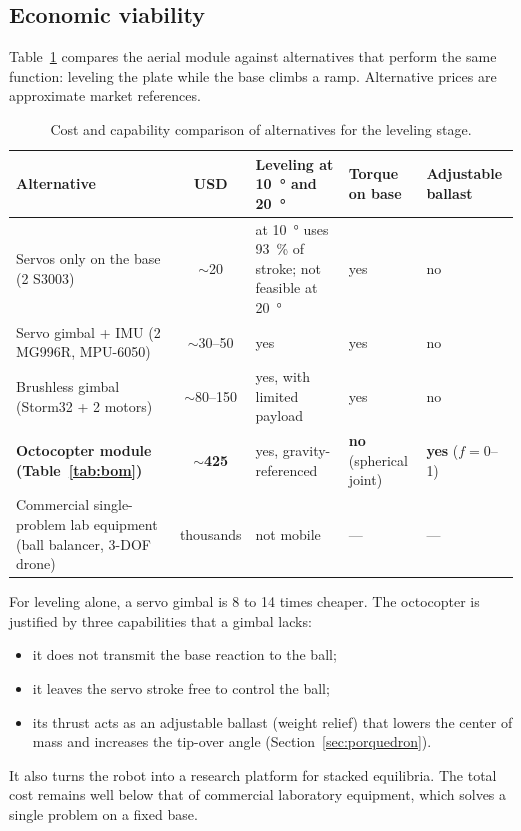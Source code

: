 \subsection{Economic viability}
\label{sec:costos}
Table~\ref{tab:costos} compares the aerial module against alternatives that perform the same function: leveling the plate while the base climbs a ramp. Alternative prices are approximate market references.

\begin{table}[!htbp]
\centering
\small
\caption{Cost and capability comparison of alternatives for the leveling stage.}
\label{tab:costos}
\begin{tabularx}{\textwidth}{@{}>{\raggedright\arraybackslash}p{}c>{\raggedright\arraybackslash}X>{\raggedright\arraybackslash}p{}>{\raggedright\arraybackslash}p{}@{}}
\toprule
Alternative & USD & Leveling at \SI{10}{\degree} and \SI{20}{\degree} & Torque on base & Adjustable ballast \\
\midrule
Servos only on the base (2 S3003) & $\sim$20 & at \SI{10}{\degree} uses \SI{93}{\percent} of stroke; not feasible at \SI{20}{\degree} & yes & no \\
Servo gimbal + IMU (2 MG996R, MPU-6050) & $\sim$30--50 & yes & yes & no \\
Brushless gimbal (Storm32 + 2 motors) & $\sim$80--150 & yes, with limited payload & yes & no \\
\textbf{Octocopter module (Table~\ref{tab:bom})} & $\sim$\textbf{425} & yes, gravity-referenced & \textbf{no} (spherical joint) & \textbf{yes} ($f=0$--1) \\
Commercial single-problem lab equipment (ball balancer, 3-DOF drone) & thousands & not mobile & --- & --- \\
\bottomrule
\end{tabularx}
\end{table}

For leveling alone, a servo gimbal is 8 to 14 times cheaper. The octocopter is justified by three capabilities that a gimbal lacks:
\begin{itemize}
  \item it does not transmit the base reaction to the ball;
  \item it leaves the servo stroke free to control the ball;
  \item its thrust acts as an adjustable ballast (weight relief) that lowers the center of mass and increases the tip-over angle (Section~\ref{sec:porquedron}).
\end{itemize}
It also turns the robot into a research platform for stacked equilibria. The total cost remains well below that of commercial laboratory equipment, which solves a single problem on a fixed base.
